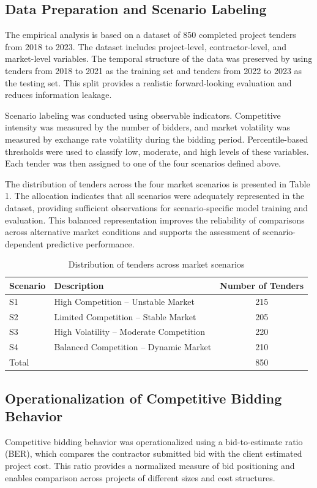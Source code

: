 \documentclass[twoside]{article}
\begin{document}
\subsection{Data Preparation and Scenario Labeling}
The empirical analysis is based on a dataset of 850 completed project tenders from 2018 to 2023. The dataset includes project-level, contractor-level, and market-level variables. The temporal structure of the data was preserved by using tenders from 2018 to 2021 as the training set and tenders from 2022 to 2023 as the testing set. This split provides a realistic forward-looking evaluation and reduces information leakage.

Scenario labeling was conducted using observable indicators. Competitive intensity was measured by the number of bidders, and market volatility was measured by exchange rate volatility during the bidding period. Percentile-based thresholds were used to classify low, moderate, and high levels of these variables. Each tender was then assigned to one of the four scenarios defined above.

The distribution of tenders across the four market scenarios is presented in Table 1. The allocation indicates that all scenarios were adequately represented in the dataset, providing sufficient observations for scenario-specific model training and evaluation. This balanced representation improves the reliability of comparisons across alternative market conditions and supports the assessment of scenario-dependent predictive performance.

\begin{table}[ht]
	\centering
	\caption{Distribution of tenders across market scenarios}
	\begin{tabular}{llc}
		\hline
		Scenario & Description & Number of Tenders \\
		\hline
		S1 & High Competition -- Unstable Market & 215 \\
		S2 & Limited Competition -- Stable Market & 205 \\
		S3 & High Volatility -- Moderate Competition & 220 \\
		S4 & Balanced Competition -- Dynamic Market & 210 \\
		Total &  & 850 \\
		\hline
	\end{tabular}
\end{table}
\newpage
\subsection{Operationalization of Competitive Bidding Behavior}
Competitive bidding behavior was operationalized using a bid-to-estimate ratio (BER), which compares the contractor submitted bid with the client estimated project cost. This ratio provides a normalized measure of bid positioning and enables comparison across projects of different sizes and cost structures.
\end{document}
